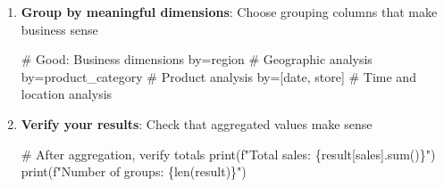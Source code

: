\documentclass[
  letterpaper,
]{scrbook}
\newenvironment{Shaded}{\begin{snugshade}}{\end{snugshade}}
\newcommand{\BuiltInTok}[1]{\textcolor[rgb]{0.00,0.23,0.31}{#1}}
\newcommand{\CommentTok}[1]{\textcolor[rgb]{0.37,0.37,0.37}{#1}}
\newcommand{\NormalTok}[1]{\textcolor[rgb]{0.00,0.23,0.31}{#1}}
\newcommand{\OperatorTok}[1]{\textcolor[rgb]{0.37,0.37,0.37}{#1}}
\newcommand{\SpecialCharTok}[1]{\textcolor[rgb]{0.37,0.37,0.37}{#1}}
\newcommand{\SpecialStringTok}[1]{\textcolor[rgb]{0.13,0.47,0.30}{#1}}
\newcommand{\StringTok}[1]{\textcolor[rgb]{0.13,0.47,0.30}{#1}}
\begin{document}
\begin{enumerate}
\begin{Shaded}
\begin{Highlighting}[]
\CommentTok{\# Good: Multiple metrics}
\NormalTok{strategy}\OperatorTok{=}\NormalTok{\{}
    \StringTok{\textquotesingle{}sales\textquotesingle{}}\NormalTok{: }\StringTok{\textquotesingle{}sum\textquotesingle{}}\NormalTok{,      }\CommentTok{\# Total sales}
    \StringTok{\textquotesingle{}price\textquotesingle{}}\NormalTok{: }\StringTok{\textquotesingle{}mean\textquotesingle{}}\NormalTok{,     }\CommentTok{\# Average price}
    \StringTok{\textquotesingle{}orders\textquotesingle{}}\NormalTok{: }\StringTok{\textquotesingle{}count\textquotesingle{}}    \CommentTok{\# Number of orders}
\NormalTok{\}}
\end{Highlighting}
\end{Shaded}
\item
  \textbf{Group by meaningful dimensions}: Choose grouping columns that
  make business sense

\begin{Shaded}
\begin{Highlighting}[]
\CommentTok{\# Good: Business dimensions}
\NormalTok{by}\OperatorTok{=}\StringTok{\textquotesingle{}region\textquotesingle{}}  \CommentTok{\# Geographic analysis}
\NormalTok{by}\OperatorTok{=}\StringTok{\textquotesingle{}product\_category\textquotesingle{}}  \CommentTok{\# Product analysis}
\NormalTok{by}\OperatorTok{=}\NormalTok{[}\StringTok{\textquotesingle{}date\textquotesingle{}}\NormalTok{, }\StringTok{\textquotesingle{}store\textquotesingle{}}\NormalTok{]  }\CommentTok{\# Time and location analysis}
\end{Highlighting}
\end{Shaded}
\item
  \textbf{Verify your results}: Check that aggregated values make sense

\begin{Shaded}
\begin{Highlighting}[]
\CommentTok{\# After aggregation, verify totals}
\BuiltInTok{print}\NormalTok{(}\SpecialStringTok{f"Total sales: }\SpecialCharTok{\{}\NormalTok{result[}\StringTok{\textquotesingle{}sales\textquotesingle{}}\NormalTok{]}\SpecialCharTok{.}\BuiltInTok{sum}\NormalTok{()}\SpecialCharTok{\}}\SpecialStringTok{"}\NormalTok{)}
\BuiltInTok{print}\NormalTok{(}\SpecialStringTok{f"Number of groups: }\SpecialCharTok{\{}\BuiltInTok{len}\NormalTok{(result)}\SpecialCharTok{\}}\SpecialStringTok{"}\NormalTok{)}
\end{Highlighting}
\end{Shaded}
\end{enumerate}
\end{document}

